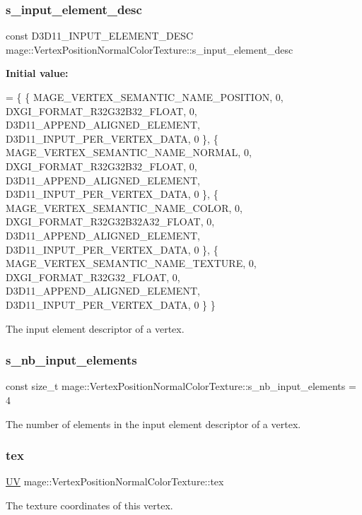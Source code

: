 \subsubsection{\texorpdfstring{s\+\_\+input\+\_\+element\+\_\+desc}{s\_input\_element\_desc}}
{\footnotesize\ttfamily const D3\+D11\+\_\+\+I\+N\+P\+U\+T\+\_\+\+E\+L\+E\+M\+E\+N\+T\+\_\+\+D\+E\+SC mage\+::\+Vertex\+Position\+Normal\+Color\+Texture\+::s\+\_\+input\+\_\+element\+\_\+desc\hspace{0.3cm}{\ttfamily [static]}}

{\bfseries Initial value\+:}
\begin{DoxyCode}
= \{
        \{ MAGE\_VERTEX\_SEMANTIC\_NAME\_POSITION, 0, DXGI\_FORMAT\_R32G32B32\_FLOAT,    0, 
      D3D11\_APPEND\_ALIGNED\_ELEMENT, D3D11\_INPUT\_PER\_VERTEX\_DATA, 0 \},
        \{ MAGE\_VERTEX\_SEMANTIC\_NAME\_NORMAL,   0, DXGI\_FORMAT\_R32G32B32\_FLOAT,    0, 
      D3D11\_APPEND\_ALIGNED\_ELEMENT, D3D11\_INPUT\_PER\_VERTEX\_DATA, 0 \},
        \{ MAGE\_VERTEX\_SEMANTIC\_NAME\_COLOR,    0, DXGI\_FORMAT\_R32G32B32A32\_FLOAT, 0, 
      D3D11\_APPEND\_ALIGNED\_ELEMENT, D3D11\_INPUT\_PER\_VERTEX\_DATA, 0 \},
        \{ MAGE\_VERTEX\_SEMANTIC\_NAME\_TEXTURE,  0, DXGI\_FORMAT\_R32G32\_FLOAT,       0, 
      D3D11\_APPEND\_ALIGNED\_ELEMENT, D3D11\_INPUT\_PER\_VERTEX\_DATA, 0 \}
    \}
\end{DoxyCode}
The input element descriptor of a vertex. \hypertarget{structmage_1_1_vertex_position_normal_color_texture_acd54df21f1baf73279d24dbc7037eeff}{}\label{structmage_1_1_vertex_position_normal_color_texture_acd54df21f1baf73279d24dbc7037eeff} 
\subsubsection{\texorpdfstring{s\+\_\+nb\+\_\+input\+\_\+elements}{s\_nb\_input\_elements}}
{\footnotesize\ttfamily const size\+\_\+t mage\+::\+Vertex\+Position\+Normal\+Color\+Texture\+::s\+\_\+nb\+\_\+input\+\_\+elements = 4\hspace{0.3cm}{\ttfamily [static]}}

The number of elements in the input element descriptor of a vertex. \hypertarget{structmage_1_1_vertex_position_normal_color_texture_a3477ce06d0778a1119cbf2e961d7c3ed}{}\label{structmage_1_1_vertex_position_normal_color_texture_a3477ce06d0778a1119cbf2e961d7c3ed} 
\subsubsection{\texorpdfstring{tex}{tex}}
{\footnotesize\ttfamily \hyperlink{structmage_1_1_u_v}{UV} mage\+::\+Vertex\+Position\+Normal\+Color\+Texture\+::tex}

The texture coordinates of this vertex. 